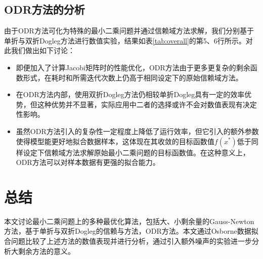 \documentclass{article}
\begin{document}
\subsection{ODR方法的分析}
由于ODR方法可化为特殊的最小二乘问题并通过信赖域方法求解，我们分别基于单折与双折Dogleg方法进行数值实验，结果如表\ref{tab:overall}的第5、6行所示。对此我们做出如下讨论：
\begin{itemize}
  \item 即便加入了计算Jacobi矩阵时的性能优化，ODR方法由于更多更复杂的剩余函数形式，在耗时和所需迭代次数上仍高于相同设定下的原始信赖域方法。
  \item 在ODR方法内部，使用双折Dogleg方法仍相较单折Dogleg具有一定的效率优势，但这种优势并不显著，实际应用中二者的选择或许不会对数值表现有决定性影响。
  \item 虽然ODR方法引入的复杂性一定程度上降低了运行效率，但它引入的额外参数使得模型能更好地拟合数据样本，这体现在其收敛的目标函数值$f(x^*)$低于同样设定下信赖域方法求解原始最小二乘问题的目标函数值。在这种意义上，ODR方法可以对样本数据有更强的拟合能力。
\end{itemize}

\section{总结}
本文讨论最小二乘问题上的多种最优化算法，包括大、小剩余量的Gauss-Newton方法，基于单折与双折Dogleg的信赖与方法，ODR方法。本文通过Osborne数据拟合问题比较了上述方法的数值表现并进行分析，通过引入额外噪声的实验进一步分析大剩余方法的意义。


\end{document}
